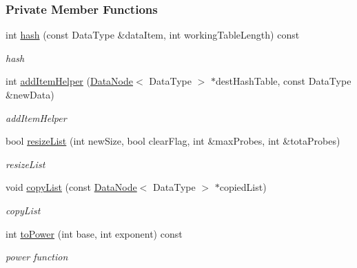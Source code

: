 \subsubsection*{Private Member Functions}
\begin{DoxyCompactItemize}
\item 
int \hyperlink{class_hash_class_acb6fbb80f8b20914895647e17da3a17b}{hash} (const Data\+Type \&data\+Item, int working\+Table\+Length) const 
\begin{DoxyCompactList}\small\item\em hash \end{DoxyCompactList}\item 
int \hyperlink{class_hash_class_ac21be11d3c6a875ce9a4f36490043218}{add\+Item\+Helper} (\hyperlink{struct_data_node}{Data\+Node}$<$ Data\+Type $>$ $\ast$dest\+Hash\+Table, const Data\+Type \&new\+Data)
\begin{DoxyCompactList}\small\item\em add\+Item\+Helper \end{DoxyCompactList}\item 
bool \hyperlink{class_hash_class_a057af8f9b6db39d2fe32c77a473b05ac}{resize\+List} (int new\+Size, bool clear\+Flag, int \&max\+Probes, int \&tota\+Probes)
\begin{DoxyCompactList}\small\item\em resize\+List \end{DoxyCompactList}\item 
void \hyperlink{class_hash_class_a7961c227e61062fe7291efdf6f6ecf84}{copy\+List} (const \hyperlink{struct_data_node}{Data\+Node}$<$ Data\+Type $>$ $\ast$copied\+List)
\begin{DoxyCompactList}\small\item\em copy\+List \end{DoxyCompactList}\item 
int \hyperlink{class_hash_class_aa3271ee470f0d113fb9d40ee5b0112b9}{to\+Power} (int base, int exponent) const 
\begin{DoxyCompactList}\small\item\em power function \end{DoxyCompactList}\end{DoxyCompactItemize}

